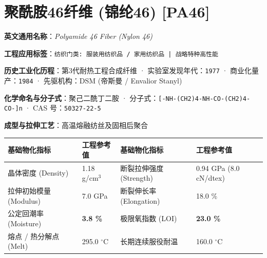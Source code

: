 \documentclass[11pt,openright,twoside,UTF8]{ctexbook}
\begin{document}
\section{聚酰胺46纤维 (锦纶46) [PA46]}
\label{sec:pa46}

\noindent\textbf{英文通用名称}：\textit{Polyamide 46 Fiber (Nylon 46)}\par
\noindent\textbf{工程应用标签}：\texttt{纺织门类: 服装用纺织品 / 家用纺织品 | 战略特种高性能}\par
\noindent\textbf{历史工业化历程}：第3代耐热工程合成纤维 · 实验室发现年代：\texttt{1977} · 商业化量产：\texttt{1984} · 先驱机构：DSM (帝斯曼 / Envalior Stanyl)\par
\noindent\textbf{化学命名与分子式}：聚己二酰丁二胺 · 分子式：\texttt{[-NH-(CH2)4-NH-CO-(CH2)4-CO-]n} · CAS 号：\texttt{50327-22-5}\par
\noindent\textbf{成型与拉伸工艺}：高温熔融纺丝及固相后聚合\par

\vspace{0.15cm}
\begin{center}
\small
\begin{tabularx}{\textwidth}{p{3.8cm}Xp{3.8cm}X}
\toprule
\textbf{基础物化指标} & \textbf{工程参考值} & \textbf{基础物化指标} & \textbf{工程参考值} \\
\midrule
晶体密度 (Density) & 1.18 g/cm$^3$ & 断裂拉伸强度 (Strength) & 0.94 GPa (8.0 cN/dtex) \\
拉伸初始模量 (Modulus) & 7.0 GPa & 断裂伸长率 (Elongation) & 18.0 \% \\
公定回潮率 (Moisture) & \textbf{3.8 \%} & 极限氧指数 (LOI) & \textbf{23.0 \%} \\
熔点 / 热分解点 (Melt) & 295.0 $^\circ\mathrm{C}$ & 长期连续服役耐温 & 160.0 $^\circ\mathrm{C}$ \\
\bottomrule
\end{tabularx}
\end{center}
\vspace{0.15cm}
\end{document}
